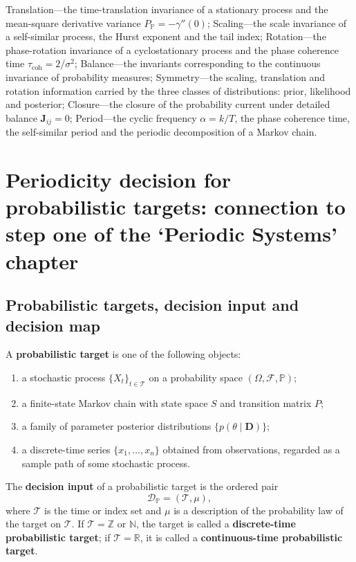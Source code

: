 \begin{remark}\label{rem:prob_seven_themes}
Translation---the time-translation invariance of a stationary process and the mean-square derivative variance $P_{\mathbb P}=-\gamma''(0)$;
Scaling---the scale invariance of a self-similar process, the Hurst exponent and the tail index;
Rotation---the phase-rotation invariance of a cyclostationary process and the phase coherence time $\tau_{\mathrm{coh}}=2/\sigma^2$;
Balance---the invariants corresponding to the continuous invariance of probability measures;
Symmetry---the scaling, translation and rotation information carried by the three classes of distributions: prior, likelihood and posterior;
Closure---the closure of the probability current under detailed balance $\mathbf J_{ij}=0$;
Period---the cyclic frequency $\alpha=k/T$, the phase coherence time, the self-similar period and the periodic decomposition of a Markov chain.
\end{remark}

\section{Periodicity decision for probabilistic targets: connection to step one of the `Periodic Systems' chapter}
\label{sec:prob_periodicity_decision}

\subsection{Probabilistic targets, decision input and decision map}

\begin{definition}\label{def:prob_target}
A \textbf{probabilistic target} is one of the following objects:
\begin{enumerate}[label=(\roman*)]
    \item a stochastic process $\{X_t\}_{t\in\mathcal T}$ on a probability space $(\Omega,\mathcal F,\mathbb P)$;
    \item a finite-state Markov chain with state space $S$ and transition matrix $P$;
    \item a family of parameter posterior distributions $\{p(\theta\mid \mathbf D)\}$;
    \item a discrete-time series $\{x_1,\dots,x_n\}$ obtained from observations, regarded as a sample path of some stochastic process.
\end{enumerate}
The \textbf{decision input} of a probabilistic target is the ordered pair
\[
\mathcal D_{\mathbb P}=(\mathcal T,\mu),
\]
where $\mathcal T$ is the time or index set and $\mu$ is a description of the probability law of the target on $\mathcal T$. If $\mathcal T=\mathbb Z$ or $\mathbb N$, the target is called a \textbf{discrete-time probabilistic target}; if $\mathcal T=\mathbb R$, it is called a \textbf{continuous-time probabilistic target}.
\end{definition}

